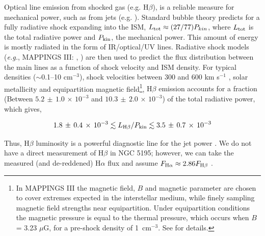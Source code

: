 \documentclass[fleqn,usenatbib]{mnras}
\begin{document}
Optical line emission from shocked gas (e.g. H$\beta$), is a reliable measure for mechanical power, 
such as from jets (e.g. \citealt{DopitaSutherland1996,Allenetal2008}). Standard bubble theory \citep{Weaver+1977} predicts for a fully radiative shock expanding into the ISM, {$L_{\rm tot} \approx (27/77)P_{kin}$, where  $L_{\rm tot}$ is the total radiative power and $P_{\rm kin}$, the mechanical power.}
This amount of energy is mostly radiated in the form of IR/optical/UV lines. Radiative shock models ({\it e.g.}, 
{\small {MAPPINGS III}}: \citealt{DopitaSutherland1996}, \citealt{Allenetal2008}) are then used to 
predict the flux distribution between the main lines as a function of shock velocity and ISM density. 
For typical densities ($\sim$0.1--10 cm$^{-3}$), shock velocities between 300 and 600 km s$^{-1}$ \citep{SJMV}, 
solar metallicity and equipartition magnetic field\footnote{{In MAPPINGS III the magnetic field, $B$ and magnetic parameter are chosen to cover extremes expected in the interstellar medium, 
while finely sampling magnetic field strengths near equipartition. Under equipartition conditions the magnetic 
pressure is equal to the thermal pressure, which occurs when $B$ = 3.23 $\mu$G, for a pre-shock 
density of 1~cm$^{-3}$. See \citealt{Allenetal2008} for details.}}, {H$\beta$ emission accounts for a 
fraction (Between $ 5.2\, \pm\, 1.0\, \times\, 10^{-3}$ and $10.3\, \pm\, 2.0\, \times\, 10^{-3}$) of the total radiative power, which gives, }

\begin{equation}
1.8\, \pm\, 0.4\, \times\, 10^{-3}  \lesssim L_{\rm{H}\beta}/P_{\rm kin} \lesssim 3.5\, \pm\, 0.7\, \times\, 10^{-3}  
\label{eq:hbeta_jet}
\end{equation}


 Thus, H$\beta$ luminosity is a powerful diagnostic line for the 
jet power \citep{Pakull+2010}. We do not have a direct measurement of H$\beta$ in NGC 5195; however, 
we can take the measured (and de-reddened) H$\alpha$ flux and assume $F_{{\rm{H}}\alpha} \approx 
2.86F_{{\rm{H}}\beta}$ \citep{OF2006}.
\end{document}
